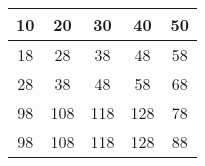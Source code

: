 \documentclass[12pt]{article}
\begin{document}
\begin{tabular}{|c|c|c| c|c|}
\hline
10  & 20  & 30  & 40  & 50 \\ \hline
\cellcolor[gray]{0.8} 18  & 28  & 38  & 48  & 58 \\ \hline	
28  & 38  & 48  & 58  & 68 \\ \hline
\cellcolor[gray]{0.7}98  & 108 & 118 & 128 & \cellcolor[gray]{0.7}78 \\ \hline
98  & 108 & 118 & 128 & 88 \\ \hline

\end{tabular}
\end{document}
